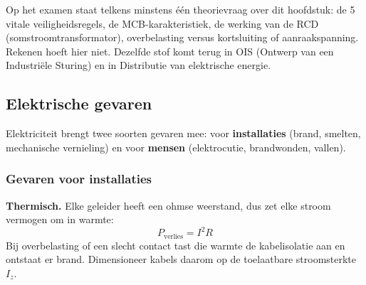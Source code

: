 \documentclass[a4paper,11pt]{article}
\begin{document}
Op het examen staat telkens minstens één theorievraag over dit hoofdstuk: de 5 vitale
veiligheidsregels, de MCB-karakteristiek, de werking van de RCD (somstroomtransformator),
overbelasting versus kortsluiting of aanraakspanning. Rekenen hoeft hier niet. Dezelfde stof komt
terug in OIS (Ontwerp van een Industriële Sturing) en in Distributie van elektrische energie.

\subsection{Elektrische gevaren}

Elektriciteit brengt twee soorten gevaren mee: voor \textbf{installaties} (brand, smelten,
mechanische vernieling) en voor \textbf{mensen} (elektrocutie, brandwonden, vallen).

\subsubsection{Gevaren voor installaties}

\textbf{Thermisch.} Elke geleider heeft een ohmse weerstand, dus zet elke stroom vermogen om in
warmte:
\[P_{\text{verlies}} = I^2 R\]
Bij overbelasting of een slecht contact tast die warmte de kabelisolatie aan en ontstaat er brand.
Dimensioneer kabels daarom op de toelaatbare stroomsterkte $I_z$.
\end{document}
